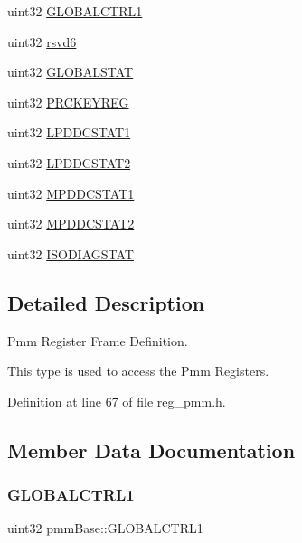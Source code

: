 \begin{DoxyCompactItemize}
\item 
uint32 \mbox{\hyperlink{structpmmBase_a53be5d06629149e2443174cbb85480f5}{G\+L\+O\+B\+A\+L\+C\+T\+R\+L1}}
\item 
uint32 \mbox{\hyperlink{structpmmBase_a335f472f79d6353f2375f97171e9c029}{rsvd6}}
\item 
uint32 \mbox{\hyperlink{structpmmBase_a7904b27a2076fa553d7367676f010af2}{G\+L\+O\+B\+A\+L\+S\+T\+AT}}
\item 
uint32 \mbox{\hyperlink{structpmmBase_a1ff077e7e04a89127edc4bfdf871d7a3}{P\+R\+C\+K\+E\+Y\+R\+EG}}
\item 
uint32 \mbox{\hyperlink{structpmmBase_a4e5041e019a31b82ba4c61abbb6a166f}{L\+P\+D\+D\+C\+S\+T\+A\+T1}}
\item 
uint32 \mbox{\hyperlink{structpmmBase_afe50e574ee38ad8af75f140d32fb33b4}{L\+P\+D\+D\+C\+S\+T\+A\+T2}}
\item 
uint32 \mbox{\hyperlink{structpmmBase_a78201311d9bb91c7fb7f1923e0f9131e}{M\+P\+D\+D\+C\+S\+T\+A\+T1}}
\item 
uint32 \mbox{\hyperlink{structpmmBase_a521748e4a9be26d429a09ffb43678daa}{M\+P\+D\+D\+C\+S\+T\+A\+T2}}
\item 
uint32 \mbox{\hyperlink{structpmmBase_a07d353c1f6e383b94762418c7c38189d}{I\+S\+O\+D\+I\+A\+G\+S\+T\+AT}}
\end{DoxyCompactItemize}


\subsection{Detailed Description}
Pmm Register Frame Definition. 

This type is used to access the Pmm Registers. 

Definition at line 67 of file reg\+\_\+pmm.\+h.



\subsection{Member Data Documentation}
\mbox{\label{structpmmBase_a53be5d06629149e2443174cbb85480f5}} 
\subsubsection{\texorpdfstring{G\+L\+O\+B\+A\+L\+C\+T\+R\+L1}{GLOBALCTRL1}}
{\footnotesize\ttfamily uint32 pmm\+Base\+::\+G\+L\+O\+B\+A\+L\+C\+T\+R\+L1}

